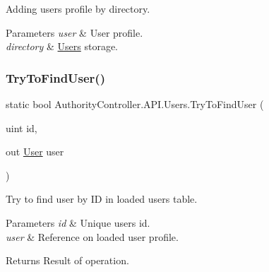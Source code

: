 Adding user\textquotesingle{}s profile by directory. 


\begin{DoxyParams}{Parameters}
{\em user} & User profile.\\
\hline
{\em directory} & \mbox{\hyperlink{class_authority_controller_1_1_a_p_i_1_1_users}{Users}} storage.\\
\hline
\end{DoxyParams}
\mbox{\label{class_authority_controller_1_1_a_p_i_1_1_users_abd0e68d6f6f3c77682e995b939daaea9}} 
\subsubsection{\texorpdfstring{Try\+To\+Find\+User()}{TryToFindUser()}\hspace{0.1cm}{\footnotesize\ttfamily [1/2]}}
{\footnotesize\ttfamily static bool Authority\+Controller.\+A\+P\+I.\+Users.\+Try\+To\+Find\+User (\begin{DoxyParamCaption}\item[{uint}]{id,  }\item[{out \mbox{\hyperlink{class_authority_controller_1_1_data_1_1_user}{User}}}]{user }\end{DoxyParamCaption})\hspace{0.3cm}{\ttfamily [static]}}



Try to find user by ID in loaded users table. 


\begin{DoxyParams}{Parameters}
{\em id} & Unique user\textquotesingle{}s id.\\
\hline
{\em user} & Reference on loaded user profile.\\
\hline
\end{DoxyParams}
\begin{DoxyReturn}{Returns}
Result of operation.
\end{DoxyReturn}
\mbox{\label{class_authority_controller_1_1_a_p_i_1_1_users_a3e152e5b11636c72e5e9610906de986a}} 
